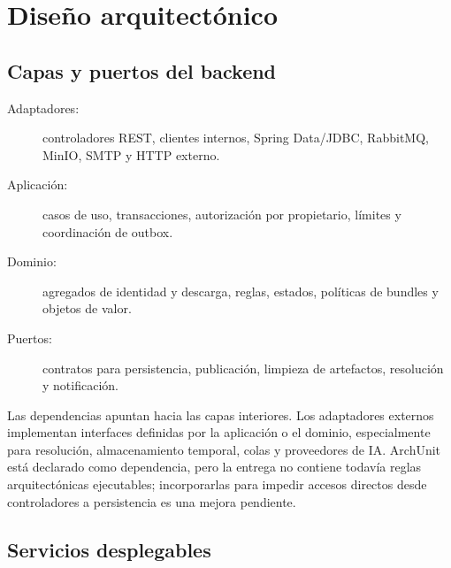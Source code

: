 \section{Diseño arquitectónico}

\subsection{Capas y puertos del backend}

\begin{description}
	\item[Adaptadores:] controladores REST, clientes internos, Spring Data/JDBC, RabbitMQ, MinIO, SMTP y HTTP externo.
	\item[Aplicación:] casos de uso, transacciones, autorización por propietario, límites y coordinación de outbox.
	\item[Dominio:] agregados de identidad y descarga, reglas, estados, políticas de bundles y objetos de valor.
	\item[Puertos:] contratos para persistencia, publicación, limpieza de artefactos, resolución y notificación.
\end{description}

Las dependencias apuntan hacia las capas interiores. Los adaptadores externos implementan interfaces definidas por la aplicación o el dominio, especialmente para resolución, almacenamiento temporal, colas y proveedores de IA. ArchUnit está declarado como dependencia, pero la entrega no contiene todavía reglas arquitectónicas ejecutables; incorporarlas para impedir accesos directos desde controladores a persistencia es una mejora pendiente.

\subsection{Servicios desplegables}

